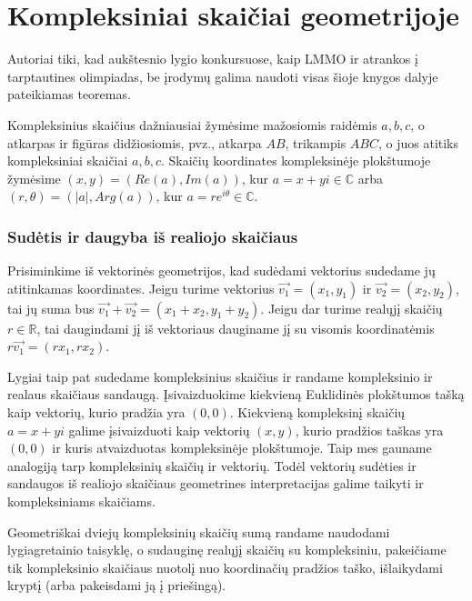 \documentclass[11pt,a4paper,twoside]{book}
\theoremstyle{definition} \newtheorem*{api}{Apibrėžimas}
\theoremstyle{remark} \newtheorem*{pastaba}{Pastaba}
\begin{document}
\chapter {Kompleksiniai skaičiai geometrijoje}

Autoriai tiki, kad aukštesnio lygio konkursuose, kaip LMMO ir atrankos į tarptautines olimpiadas, be įrodymų galima naudoti visas šioje knygos dalyje pateikiamas teoremas.

Kompleksinius skaičius dažniausiai žymėsime mažosiomis raidėmis $a, b, c$, o atkarpas ir figūras didžiosiomis, pvz., atkarpa $AB$, trikampis $ABC$, o juos atitiks kompleksiniai skaičiai $a, b, c$. Skaičių koordinates kompleksinėje plokštumoje žymėsime $(x, y)=(Re (a), Im (a))$, kur $a = x + yi \in \mathbb{C}$ arba  $(r, \theta)=(|a|, Arg(a))$, kur $a = re^{i\theta} \in \mathbb{C}$. 




\subsection*{Sudėtis ir daugyba iš realiojo skaičiaus}

Prisiminkime iš vektorinės geometrijos, kad sudėdami vektorius sudedame jų atitinkamas koordinates. Jeigu turime vektorius $\overrightarrow{v_1}=(x_1, y_1)$ ir $\overrightarrow{v_2}=(x_2, y_2)$, tai jų suma bus $\overrightarrow{v_1}+\overrightarrow{v_2}=(x_1+x_2, y_1+y_2)$. Jeigu dar turime realųjį skaičių $r \in \mathbb{R}$, tai daugindami jį iš vektoriaus dauginame jį su visomis koordinatėmis $r  \overrightarrow{v_1}=(r  x_1, r  x_2)$.

Lygiai taip pat sudedame kompleksinius skaičius ir randame kompleksinio ir realaus skaičiaus sandaugą. Įsivaizduokime kiekvieną Euklidinės plokštumos tašką kaip vektorių, kurio pradžia yra $(0, 0)$. Kiekvieną kompleksinį skaičių $a = x + yi$ galime įsivaizduoti kaip vektorių $(x, y)$, kurio pradžios taškas yra $(0, 0)$ ir kuris atvaizduotas kompleksinėje plokštumoje. Taip mes gauname analogiją tarp kompleksinių skaičių ir vektorių. Todėl vektorių sudėties ir sandaugos iš realiojo skaičiaus geometrines interpretacijas galime taikyti ir kompleksiniams skaičiams. 


Geometriškai dviejų kompleksinių skaičių sumą randame naudodami lygiagretainio taisyklę, o sudauginę realųjį skaičių su kompleksiniu, pakeičiame tik kompleksinio skaičiaus nuotolį nuo koordinačių pradžios taško, išlaikydami kryptį (arba pakeisdami ją į priešingą). 
\end{document}
